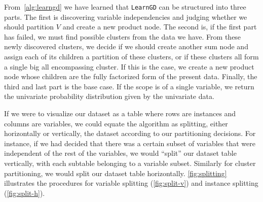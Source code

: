 \documentclass{amsart}
\theoremstyle{plain}
\numberwithin{equation}{section}
\newcommand{\code}[1]{\lstinline[mathescape=true]{#1}}
\begin{document}
From~\autoref{alg:learngd} we have learned that \code{LearnGD} can be structured into three parts.
The first is discovering variable independencies and judging whether we should partition $V$ and
create a new product node. The second is, if the first part has failed, we must find possible
clusters from the data we have. From these newly discovered clusters, we decide if we should create
another sum node and assign each of its children a partition of these clusters, or if these
clusters all form a single big all encompassing cluster. If this is the case, we create a new
product node whose children are the fully factorized form of the present data. Finally, the third
and last part is the base case. If the scope is of a single variable, we return the univariate
probability distribution given by the univariate data.

If we were to visualize our dataset as a table where rows are instances and columns are variables,
we could equate the algorithm as splitting, either horizontally or vertically, the dataset
according to our partitioning decisions. For instance, if we had decided that there was a certain
subset of variables that were independent of the rest of the variables, we would ``split'' our
dataset table vertically, with each subtable belonging to a variable subset. Similarly for cluster
partitioning, we would split our dataset table horizontally. \autoref{fig:splitting} illustrates
the procedures for variable splitting (\autoref{fig:split-v}) and instance splitting
(\autoref{fig:split-h}).
\end{document}
